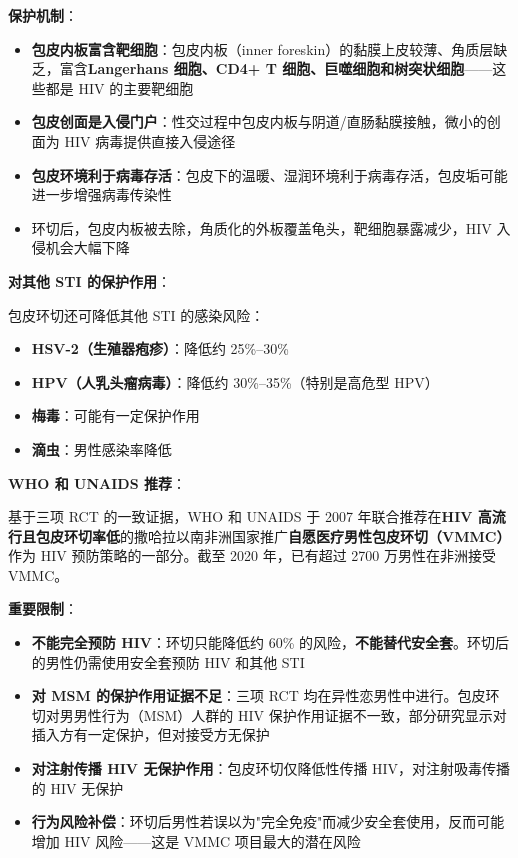 \vspace{0.5em}
\noindent\textbf{保护机制}：

\begin{itemize}[leftmargin=2cm]
	\item \textbf{包皮内板富含靶细胞}：包皮内板（inner foreskin）的黏膜上皮较薄、角质层缺乏，富含\textbf{Langerhans 细胞、CD4+ T 细胞、巨噬细胞和树突状细胞}——这些都是 HIV 的主要靶细胞
	\item \textbf{包皮创面是入侵门户}：性交过程中包皮内板与阴道/直肠黏膜接触，微小的创面为 HIV 病毒提供直接入侵途径
	\item \textbf{包皮环境利于病毒存活}：包皮下的温暖、湿润环境利于病毒存活，包皮垢可能进一步增强病毒传染性
	\item 环切后，包皮内板被去除，角质化的外板覆盖龟头，靶细胞暴露减少，HIV 入侵机会大幅下降
\end{itemize}

\vspace{0.5em}
\noindent\textbf{对其他 STI 的保护作用}：

包皮环切还可降低其他 STI 的感染风险：
\begin{itemize}[leftmargin=2cm]
	\item \textbf{HSV-2（生殖器疱疹）}：降低约 25\%--30\%
	\item \textbf{HPV（人乳头瘤病毒）}：降低约 30\%--35\%（特别是高危型 HPV）
	\item \textbf{梅毒}：可能有一定保护作用
	\item \textbf{滴虫}：男性感染率降低
\end{itemize}

\vspace{0.5em}
\noindent\textbf{WHO 和 UNAIDS 推荐}：

基于三项 RCT 的一致证据，WHO 和 UNAIDS 于 2007 年联合推荐在\textbf{HIV 高流行且包皮环切率低}的撒哈拉以南非洲国家推广\textbf{自愿医疗男性包皮环切（VMMC）}作为 HIV 预防策略的一部分。截至 2020 年，已有超过 2700 万男性在非洲接受 VMMC。

\vspace{0.5em}
\noindent\textbf{重要限制}：

\begin{itemize}[leftmargin=2cm]
	\item \textbf{不能完全预防 HIV}：环切只能降低约 60\% 的风险，\textbf{不能替代安全套}。环切后的男性仍需使用安全套预防 HIV 和其他 STI
	\item \textbf{对 MSM 的保护作用证据不足}：三项 RCT 均在异性恋男性中进行。包皮环切对男男性行为（MSM）人群的 HIV 保护作用证据不一致，部分研究显示对插入方有一定保护，但对接受方无保护
	\item \textbf{对注射传播 HIV 无保护作用}：包皮环切仅降低性传播 HIV，对注射吸毒传播的 HIV 无保护
	\item \textbf{行为风险补偿}：环切后男性若误以为"完全免疫"而减少安全套使用，反而可能增加 HIV 风险——这是 VMMC 项目最大的潜在风险
\end{itemize}

